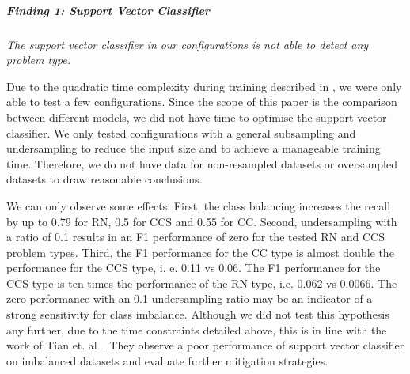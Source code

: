 \subparagraph{Finding 1: Support Vector Classifier} 
\textit{The support vector classifier in our configurations is not able to detect any problem type.}

Due to the quadratic time complexity during training described in , we were only able to test a few configurations. Since the scope of this paper is the comparison between different models, we did not have time to optimise the support vector classifier. We only tested configurations with a general subsampling and undersampling to reduce the input size and to achieve a manageable training time. Therefore, we do not have data for non-resampled datasets or oversampled datasets to draw reasonable conclusions. 

We can only observe some effects:
First, the class balancing increases the recall by up to 0.79 for RN, 0.5 for CCS and 0.55 for CC. Second, undersampling with a ratio of 0.1 results in an F1 performance of zero for the tested RN and CCS problem types. Third, the F1 performance for the CC type is almost double the performance for the CCS type, i. e. 0.11 vs 0.06. The F1 performance for the CCS type is ten times the performance of the RN type, i.e. 0.062 vs 0.0066. 
The zero performance with an 0.1 undersampling ratio may be an indicator of a strong sensitivity for class imbalance. Although we did not test this hypothesis any further, due to the time constraints detailed above, this is in line with the work of Tian et. al~\cite{tian_imbalanced_2011}. They observe a poor performance of support vector classifier on imbalanced datasets and evaluate further mitigation strategies. 

\begin{center}
\end{center}


